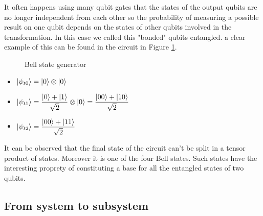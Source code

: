 \documentclass{article}
\begin{document}
It often happens using many qubit gates that the states of the output
qubits are no longer independent from each other so the probability
of measuring a possible result on one qubit depends on the states of
other qubits involved in the transformation.
In this case we called this "bonded" qubits entangled.
a clear example of this can be found in the circuit in Figure \ref{entanglement}.\\

\begin{figure}[H]
	\centering
	\caption{Bell state generator}
	\label{entanglement}
\end{figure}

\begin{itemize}
	\item $\ket{\psi_{t0}} = \ket{0} \otimes \ket{0}$
	\item $\ket{\psi_{t1}} = \dfrac{\ket{0}+\ket{1}}{\sqrt{2}} \otimes \ket{0} = \dfrac{\ket{00}+\ket{10}}{\sqrt{2}}$
	\item $\ket{\psi_{t2}} = \dfrac{\ket{00}+\ket{11}}{\sqrt{2}}$

\end{itemize}
It can be observed that the final state of the circuit can't be split
in a tensor product of states.
Moreover it is one of the four Bell states.
Such states have the interesting proprety of constituting a base for all
the entangled states of two qubits.

\subsection{From system to subsystem}
\end{document}
